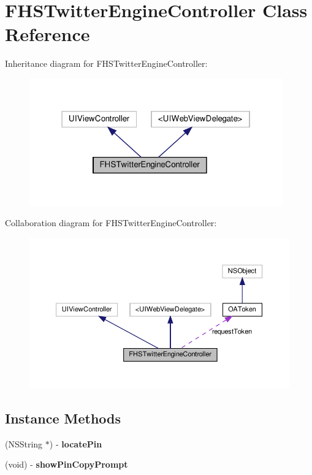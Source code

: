 \hypertarget{interfaceFHSTwitterEngineController}{}\section{F\+H\+S\+Twitter\+Engine\+Controller Class Reference}
\label{interfaceFHSTwitterEngineController}


Inheritance diagram for F\+H\+S\+Twitter\+Engine\+Controller\+:
\nopagebreak
\begin{figure}[H]
\begin{center}
\leavevmode
\includegraphics[width=310pt]{interfaceFHSTwitterEngineController__inherit__graph}
\end{center}
\end{figure}


Collaboration diagram for F\+H\+S\+Twitter\+Engine\+Controller\+:
\nopagebreak
\begin{figure}[H]
\begin{center}
\leavevmode
\includegraphics[width=350pt]{interfaceFHSTwitterEngineController__coll__graph}
\end{center}
\end{figure}
\subsection*{Instance Methods}
\begin{DoxyCompactItemize}
\item 
\mbox{\label{interfaceFHSTwitterEngineController_a9390e5a2edb6fa6aad47ed19007ec86c}} 
(N\+S\+String $\ast$) -\/ {\bfseries locate\+Pin}
\item 
\mbox{\label{interfaceFHSTwitterEngineController_a6ada4a1ce8f236a3dc5238a440225ed1}} 
(void) -\/ {\bfseries show\+Pin\+Copy\+Prompt}
\end{DoxyCompactItemize}
